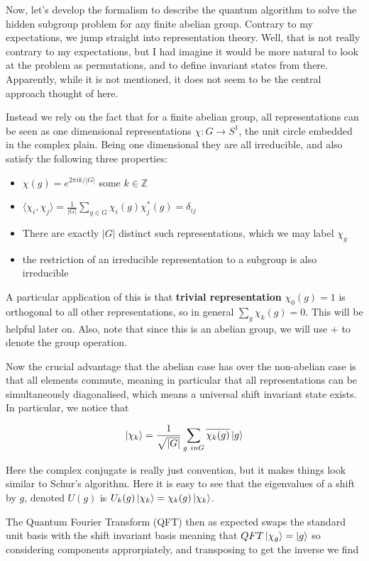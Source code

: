 \documentclass{article}
\theoremstyle{definition}
\begin{document}
Now, let's develop the formalism to describe the quantum algorithm to solve the
hidden subgroup problem for any finite abelian group. Contrary to my
expectations, we jump straight into representation theory. Well, that is not
really contrary to my expectations, but I had imagine it would be more natural
to look at the problem as permutations, and to define invariant states from
there. Apparently, while it is not mentioned, it does not seem to be the central
approach thought of here.

Instead we rely on the fact that for a finite abelian group, all representations
can be seen as one dimensional representations $\chi : G \to S^1$, the unit
circle embedded in the complex plain. Being one dimensional they are all
irreducible, and also satisfy the following three properties:

\begin{itemize}
\item $\chi(g) = e^{2\pi i k / |G|}$ some $k \in \mathbb{Z}$
\item $\langle \chi_i, \chi_j \rangle = \frac{1}{|G|} \sum_{g \in G} \chi_i(g)
  \chi_j^*(g) = \delta_{ij}$
\item There are exactly $|G|$ distinct such representations, which we may label
  $\chi_g$
\item the restriction of an irreducible representation to a subgroup is also
  irreducible
\end{itemize}

A particular application of this is that \textbf{trivial representation}
$\chi_0(g) = 1$ is orthogonal to all other representations, so in general
$\sum_g \chi_k(g) = 0$. This will be helpful later on. Also, note that since
this is an abelian group, we will use $+$ to denote the group operation.

Now the crucial advantage that the abelian case has over the non-abelian case is
that all elements commute, meaning in particular that all representations can be
simultaneously diagonalised, which means a universal shift invariant state
exists. In particular, we notice that

$$ \ket{\chi_k} = \frac{1}{\sqrt{|G|}} \sum_{g \ in G} \overline{\chi_k(g)}
\ket{g} $$

Here the complex conjugate is really just convention, but it makes things look
similar to Schur's algorithm. Here it is easy to see that the eigenvalues of a
shift by $g$, denoted $U(g)$ is $U_k(g) \ket{\chi_k} = \chi_k(g) \ket{\chi_k}$.

The Quantum Fourier Transform (QFT) then as expected swaps the standard unit
basis with the shift invariant basis meaning that $QFT \ket{\chi_g} = \ket{g}$
so considering components approrpiately, and transposing to get the inverse we
find
\end{document}
